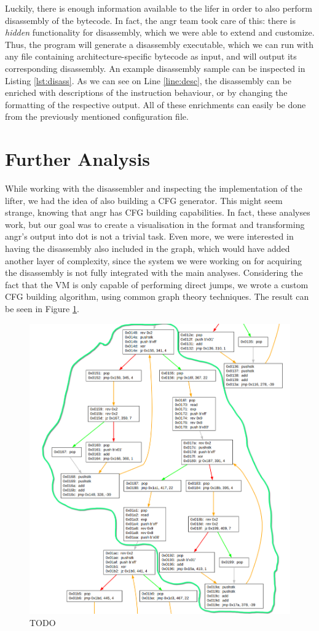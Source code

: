 Luckily, there is enough information available to the lifer in order to also perform disassembly of the bytecode. In fact, the angr team took care of this: there is \emph{hidden} functionality for disassembly, which we were able to extend and customize. Thus, the  program will generate a disassembly executable, which we can run with any file containing architecture-specific bytecode as input, and will output its corresponding disassembly. An example disassembly sample can be inspected in Listing \ref{lst:disass}. As we can see on Line \ref{line:desc}, the disassembly can be enriched with descriptions of the instruction behaviour, or by changing the formatting of the respective output. All of these enrichments can easily be done from the previously mentioned  configuration file.

\section{Further Analysis}

While working with the disassembler and inspecting the implementation of the  lifter, we had the idea of also building a \gls{CFG} generator. This might seem strange, knowing that angr has \gls{CFG} building capabilities. In fact, these analyses work, but our goal was to create a visualisation in the  format and transforming angr's output into dot is not a trivial task. Even more, we were interested in having the disassembly also included in the graph, which would have added another layer of complexity, since the system we were working on for acquiring the disassembly is not fully integrated with the main analyses. Considering the fact that the  \gls{VM} is only capable of performing direct jumps, we wrote a custom \gls{CFG} building algorithm, using common graph theory techniques. The result can be seen in Figure \ref{fig:cfg_bytecode}.

\begin{figure}[h]
    \centering
    \includegraphics[width=.8\textwidth]{./images/cfg}
    \caption{TODO}
    \label{fig:cfg_bytecode}
\end{figure}

